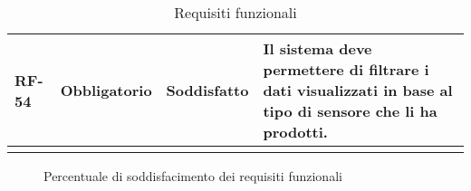\begin{longtable}{|>{\centering\arraybackslash}m{}|>{\centering\arraybackslash}m{}|>{\centering\arraybackslash}m{}|>{\centering\arraybackslash}m{}|}
	\\\hline
	RF-54           & Obbligatorio        & Soddisfatto                                                                                                           & Il sistema deve permettere di filtrare i dati visualizzati in base al tipo di sensore che li ha prodotti.
	\\\hline
	\caption{Requisiti funzionali}
\end{longtable}

\begin{figure}[!h]
	\centering
	\caption{Percentuale di soddisfacimento dei requisiti funzionali}
\end{figure}

